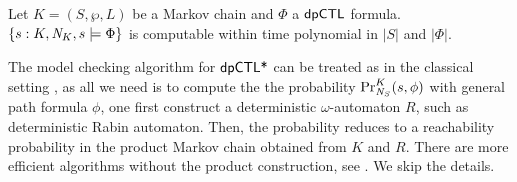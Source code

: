 \begin{corollary}
  Let $K = (S, \wp, L)$ be a Markov chain and $\Phi$ a $\dpCTL$
  formula. $\{ s : K, \neighbor{K}, s \models \Phi \}$ is
  computable within time polynomial in $|S|$ and $|\Phi|$.
\end{corollary}

The model checking algorithm for $\dpCTLstar$ can be treated as in the classical setting \cite{BK:08:PMC}, as all we need is to  compute the the probability
  $\myPr{s}{K}{\neighbor{S}}{\phi}$ with general path formula $\phi$, one first construct a deterministic $\omega$-automaton $R$, such as deterministic Rabin automaton. Then, the probability reduces to a 
  reachability probability in the product Markov chain obtained from $K$ and $R$. There are more efficient algorithms without the product construction, see \cite{}. We skip the details. 